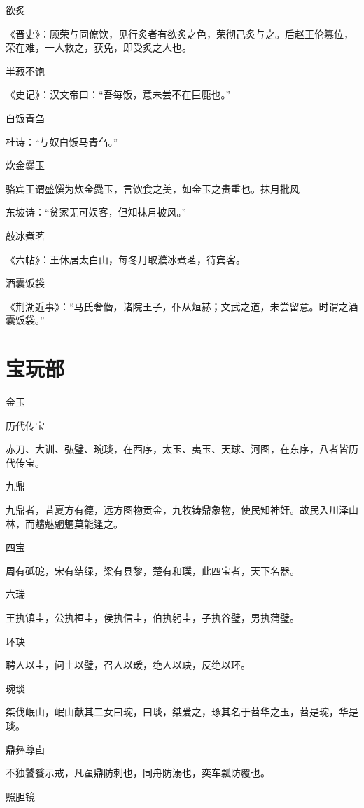 \documentclass[a4paper,12pt,UTF8,twoside]{ctexbook}
\begin{document}
    欲炙
    
    《晋史》：顾荣与同僚饮，见行炙者有欲炙之色，荣彻己炙与之。后赵王伦篡位，荣在难，一人救之，获免，即受炙之人也。
    
    半菽不饱
    
    《史记》：汉文帝曰：“吾每饭，意未尝不在巨鹿也。”
    
    白饭青刍
    
    杜诗：“与奴白饭马青刍。”
    
    炊金爨玉
    
    骆宾王谓盛馔为炊金爨玉，言饮食之美，如金玉之贵重也。抹月批风
    
    东坡诗：“贫家无可娱客，但知抹月披风。”
    
    敲冰煮茗
    
    《六帖》：王休居太白山，每冬月取濮冰煮茗，待宾客。
    
    酒囊饭袋
    
    《荆湖近事》：“马氏奢僭，诸院王子，仆从烜赫；文武之道，未尝留意。时谓之酒囊饭袋。”
    
    \part{宝玩部}
    
    金玉
    
    历代传宝
    
    赤刀、大训、弘璧、琬琰，在西序，太玉、夷玉、天球、河图，在东序，八者皆历代传宝。
    
    九鼎
    
    九鼎者，昔夏方有德，远方图物贡金，九牧铸鼎象物，使民知神奸。故民入川泽山林，而魑魅魍魉莫能逢之。
    
    四宝
    
    周有砥砨，宋有结绿，梁有县黎，楚有和璞，此四宝者，天下名器。
    
    六瑞
    
    王执镇圭，公执桓圭，侯执信圭，伯执躬圭，子执谷璧，男执蒲璧。
    
    环玦
    
    聘人以圭，问士以璧，召人以瑗，绝人以玦，反绝以环。
    
    琬琰
    
    桀伐岷山，岷山献其二女曰琬，曰琰，桀爱之，琢其名于苕华之玉，苕是琬，华是琰。
    
    鼎彝尊卣
    
    不独饕餮示戒，凡虿鼎防刺也，同舟防溺也，奕车瓢防覆也。
    
    照胆镜
    
\end{document}
